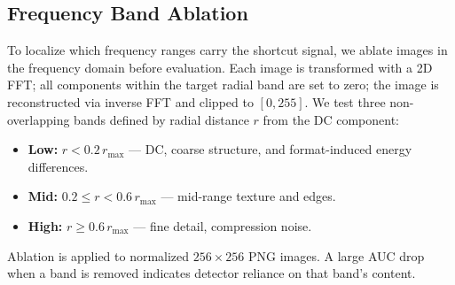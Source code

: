 \subsection{Frequency Band Ablation}
\label{sec:ablation_method}

To localize which frequency ranges carry the shortcut signal, we ablate images in the frequency domain before evaluation. Each image is transformed with a 2D FFT; all components within the target radial band are set to zero; the image is reconstructed via inverse FFT and clipped to $[0, 255]$. We test three non-overlapping bands defined by radial distance $r$ from the DC component:
\begin{itemize}
  \item \textbf{Low:} $r < 0.2\,r_{\max}$ --- DC, coarse structure, and format-induced energy differences.
  \item \textbf{Mid:} $0.2 \leq r < 0.6\,r_{\max}$ --- mid-range texture and edges.
  \item \textbf{High:} $r \geq 0.6\,r_{\max}$ --- fine detail, compression noise.
\end{itemize}
Ablation is applied to normalized $256\times256$ PNG images. A large AUC drop when a band is removed indicates detector reliance on that band's content.
